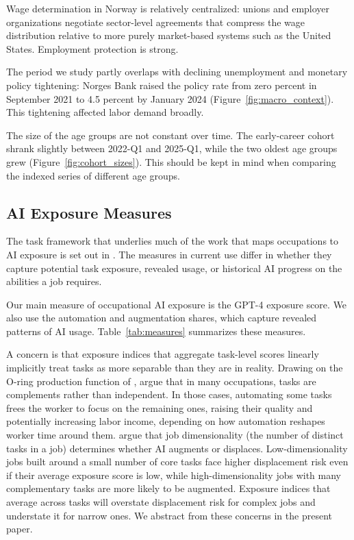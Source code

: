 \documentclass[12pt]{article}
\begin{document}
Wage determination in Norway is relatively centralized: unions and employer organizations negotiate sector-level agreements that compress the wage distribution relative to more purely market-based systems such as the United States. Employment protection is strong.

The period we study partly overlaps with declining unemployment and monetary policy tightening: Norges Bank raised the policy rate from zero percent in September 2021 to 4.5 percent by January 2024 (Figure~\ref{fig:macro_context}). This tightening affected labor demand broadly.

The size of the age groups are not constant over time. The early-career cohort shrank slightly between 2022-Q1 and 2025-Q1, while the two oldest age groups grew (Figure~\ref{fig:cohort_sizes}). This should be kept in mind when comparing the indexed series of different age groups.

\subsection{AI Exposure Measures}\label{sec:data:ai}

The task framework that underlies much of the work that maps occupations to AI exposure is set out in \citep{autor2003skill, acemoglu2011, acemoglu2018race, acemoglu2019automation}. The measures in current use differ in whether they capture potential task exposure, revealed usage, or historical AI progress on the abilities a job requires.

Our main measure of occupational AI exposure is the \citet{eloundou2024} GPT-4 exposure score. We also use the \citet{handa2025} automation and augmentation shares, which capture revealed patterns of AI usage. Table~\ref{tab:measures} summarizes these measures.

A concern is that exposure indices that aggregate task-level scores linearly implicitly treat tasks as more separable than they are in reality. Drawing on the O-ring production function of \citep{kremer1993}, \cite{gans2025} argue that in many occupations, tasks are complements rather than independent. In those cases, automating some tasks frees the worker to focus on the remaining ones, raising their quality and potentially increasing labor income, depending on how automation reshapes worker time around them. \cite{imas2026} argue that job dimensionality (the number of distinct tasks in a job) determines whether AI augments or displaces. Low-dimensionality jobs built around a small number of core tasks face higher displacement risk even if their average exposure score is low, while high-dimensionality jobs with many complementary tasks are more likely to be augmented. Exposure indices that average across tasks will overstate displacement risk for complex jobs and understate it for narrow ones. We abstract from these concerns in the present paper. 
\end{document}
